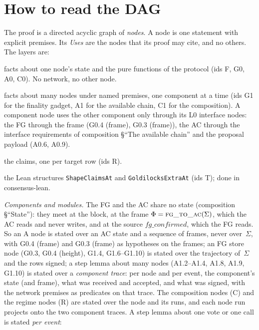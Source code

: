 \documentclass{article}
\newcommand{\Fr}{\Phi}
\newcommand{\fname}[1]{\text{\textsc{#1}}}
\begin{document}
\section{How to read the DAG}\label{sec:dag-rules}

The proof is a directed acyclic graph of \emph{nodes}.  A node is one
statement with explicit premises.  Its \emph{Uses} are the nodes that its
proof may cite, and no others.  The layers are:
\begin{description}[itemsep=0pt]
\item[L0, foundations:] facts about one node's state and the pure functions of
  the protocol (ids \textsf{F}, \textsf{G0}, \textsf{A0}, \textsf{C0}).  No
  network, no other node.
\item[L1, components:] facts about many nodes under named premises, one
  component at a time (ids \textsf{G1} for the finality gadget, \textsf{A1}
  for the available chain, \textsf{C1} for the composition).  A component
  node uses the other component only through its L0 interface nodes:
  the FG through the frame (G0.4 (frame), G0.3 (frame)), the AC through the
  interface requirements of composition \S``The available chain'' and the
  proposal payload (A0.6, A0.9).
\item[L2, regimes:] the claims, one per target row (ids \textsf{R}).
\item[L3, assembly:] the Lean structures \texttt{ShapeClaimsAt} and
  \texttt{GoldilocksExtraAt} (ids \textsf{T}); done in consensus-lean.
\end{description}
\emph{Components and modules.}  The FG and the AC share no state
(composition \S``State''): they meet at the block, at the frame
$\Fr=\fname{fg\_to\_ac}(\Sigma)$, which the AC reads and never writes, and at
the source $\mathit{fg\_confirmed}$, which the FG reads.  So an \textsf{A} node
is stated over an AC state and a sequence of frames, never over~$\Sigma$, with
G0.4 (frame) and G0.3 (frame) as hypotheses on the frames; an FG store node
(G0.3, G0.4 (height), G1.4, G1.6--G1.10) is stated over the trajectory
of~$\Sigma$ and the rows signed; a step lemma about many nodes (A1.2--A1.4,
A1.8, A1.9, G1.10) is stated over a \emph{component trace}: per node and per
event, the component's state (and frame), what was received and accepted, and
what was signed, with the network premises as predicates on that trace.  The
composition nodes (\textsf{C}) and the regime nodes (\textsf{R}) are stated over
the node and its runs, and each node run projects onto the two component
traces.  A step lemma about one vote or one call is stated \emph{per event}:
\end{document}

